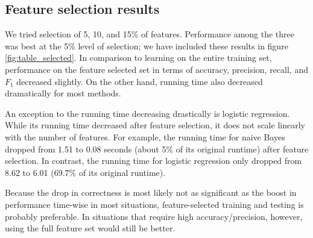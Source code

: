 \documentclass{article} %
\begin{document}
\subsection{Feature selection results}
We tried selection of 5, 10, and 15\% of features. Performance among the three was best at the 5\% level of selection; we have included these results in figure \ref{fig:table_selected}. In comparison to learning on the entire training set, performance on the feature selected set in terms of accuracy, precision, recall, and $F_1$ decreased slightly. On the other hand, running time also decreased dramatically for most methods.  

An exception to the running time decreasing drastically is logistic regression. While its running time decreased after feature selection, it does not scale linearly with the number of features. For example, the running time for naive Bayes dropped from 1.51 to 0.08 seconds (about 5\% of its original runtime) after feature selection. In contrast, the running time for logistic regression only dropped from 8.62 to 6.01 (69.7\% of its original runtime). 

Because the drop in correctness is most likely not as significant as the boost in performance time-wise in most situations, feature-selected training and testing is probably preferable. In situations that require high accuracy/precision, however, using the full feature set would still be better. 
\end{document}
